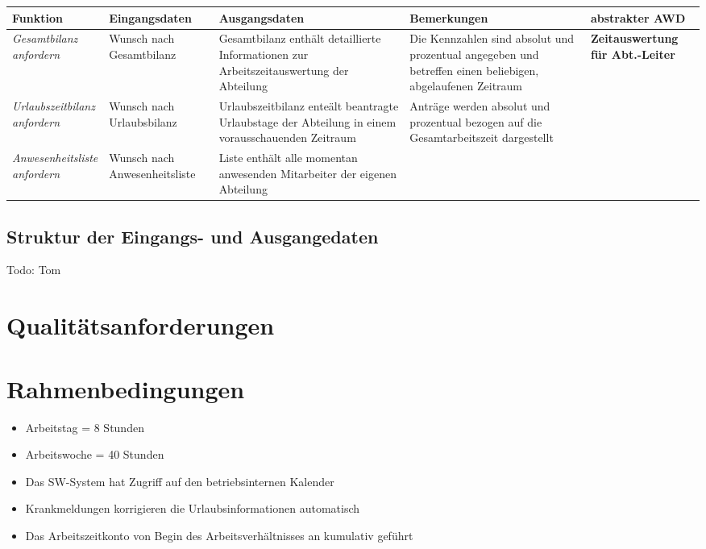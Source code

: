 {
\hspace{-3,5cm}
\footnotesize
\begin{tabular}{|p{3cm}|p{4cm}|p{4cm}|p{4cm}|p{2cm}|}
	\hline
		\textbf{Funktion	} &	
		\textbf{Eingangsdaten} &
		\textbf{Ausgangsdaten}& 
		\textbf{Bemerkungen}	&
		\textbf{abstrakter AWD} \\
	\hline \hline 
		\textit{Gesamtbilanz \newline anfordern} &
		Wunsch nach Gesamtbilanz &
		Gesamtbilanz enth\"alt detaillierte Informationen zur Arbeits\-zeit\-auswertung der Abteilung &
		Die Kennzahlen sind absolut und prozentual angegeben und betreffen einen beliebigen, abgelaufenen Zeitraum &
		\textbf{Zeitaus\-wertung f\"ur Abt.-Leiter}\\
	\cline{1-4}
		\textit{Urlaubszeitbilanz \newline anfordern} &
		Wunsch nach Urlaubsbilanz &
		Urlaubszeitbilanz ente\"alt beantragte Urlaubstage der Abteilung in einem vorausschauenden Zeitraum &
		Antr\"age werden absolut und prozentual bezogen auf die Gesamtarbeitszeit dargestellt &
		\\ 
	\cline{1-4}
		\textit{Anwesenheitsliste \newline anfordern}&
		Wunsch nach Anwesenheitsliste &
		Liste enth\"alt alle momentan anwesenden Mitarbeiter der eigenen Abteilung &
		&
		\\
	\hline
\end{tabular}
}

\subsection{Struktur der Eingangs- und Ausgangedaten}
Todo: Tom
\section{Qualit\"atsanforderungen}

\section{Rahmenbedingungen}

\begin{itemize}
	\item Arbeitstag  =  8 Stunden
	\item Arbeitswoche = 40 Stunden
	\item Das SW-System hat Zugriff auf den betriebsinternen Kalender
	\item Krankmeldungen korrigieren die Urlaubsinformationen automatisch
	\item Das Arbeitszeitkonto von Begin des Arbeitsverh\"altnisses an kumulativ gef\"uhrt 
\end{itemize}


